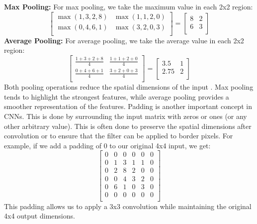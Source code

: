 \noindent\textbf{Max Pooling:}
For max pooling, we take the maximum value in each 2x2 region:
\[
\begin{bmatrix}
\max(1,3,2,8) & \max(1,1,2,0) \\
\max(0,4,6,1) & \max(3,2,0,3)\\
\end{bmatrix} =
\begin{bmatrix}
8 & 2 \\
6 & 3 \\
\end{bmatrix}
\]
\textbf{Average Pooling:}
For average pooling, we take the average value in each 2x2 region:
\[
\begin{bmatrix}
\frac{1+3+2+8}{4} & \frac{1+1+2+0}{4} \\
\frac{0+4+6+1}{4} & \frac{3+2+0+3}{4} \\
\end{bmatrix} =
\begin{bmatrix}
3.5 & 1 \\
2.75 & 2 \\
\end{bmatrix}
\]
Both pooling operations reduce the spatial dimensions of the input \cite{cs231n}. Max pooling tends to highlight the strongest features, while average pooling provides a smoother representation of the features.
Padding is another important concept in CNNs. This is done by surrounding the input matrix with zeros or ones (or any other arbitrary value). This is often done to preserve the spatial dimensions after convolution or to ensure that the filter can be applied to border pixels. For example, if we add a padding of 0 to our original 4x4 input, we get:
\[
\begin{bmatrix}
0 & 0 & 0 & 0 & 0 & 0 \\
0 & 1 & 3 & 1 & 1 & 0 \\
0 & 2 & 8 & 2 & 0 & 0 \\
0 & 0 & 4 & 3 & 2 & 0 \\
0 & 6 & 1 & 0 & 3 & 0 \\
0 & 0 & 0 & 0 & 0 & 0 \\
\end{bmatrix}
\]
This padding allows us to apply a 3x3 convolution while maintaining the original 4x4 output dimensions.


